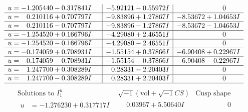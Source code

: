 \documentclass[1p]{elsarticle_modified}
\theoremstyle{definition}
\newcommand{\I}{\sqrt{-1}}
\begin{document}
$$\begin{array}{c|c|c}
\begin{aligned}
u &= -1.205440 - 0.317841 I\end{aligned}
 & -5.92121 - 0.55972 I & \phantom{-0.000000 } 0 \\ \hline\begin{aligned}
u &= \phantom{-}0.210116 + 0.707797 I\end{aligned}
 & -9.83896 + 1.27867 I & -8.53672 + 1.04653 I \\ \hline\begin{aligned}
u &= \phantom{-}0.210116 - 0.707797 I\end{aligned}
 & -9.83896 - 1.27867 I & -8.53672 - 1.04653 I \\ \hline\begin{aligned}
u &= -1.254520 + 0.166796 I\end{aligned}
 & -4.29080 + 2.46551 I & \phantom{-0.000000 } 0 \\ \hline\begin{aligned}
u &= -1.254520 - 0.166796 I\end{aligned}
 & -4.29080 - 2.46551 I & \phantom{-0.000000 } 0 \\ \hline\begin{aligned}
u &= -0.174059 + 0.708931 I\end{aligned}
 & -1.55154 + 0.37866 I & -6.90408 + 0.22967 I \\ \hline\begin{aligned}
u &= -0.174059 - 0.708931 I\end{aligned}
 & -1.55154 - 0.37866 I & -6.90408 - 0.22967 I \\ \hline\begin{aligned}
u &= \phantom{-}1.247700 + 0.308289 I\end{aligned}
 & \phantom{-}0.28331 - 2.20403 I & \phantom{-0.000000 } 0 \\ \hline\begin{aligned}
u &= \phantom{-}1.247700 - 0.308289 I\end{aligned}
 & \phantom{-}0.28331 + 2.20403 I & \phantom{-0.000000 } 0\\
 \hline 
 \end{array}$$\newpage$$\begin{array}{c|c|c}  
\text{Solutions to }I^u_{1}& \I (\text{vol} + \sqrt{-1}CS) & \text{Cusp shape}\\
 \hline 
\begin{aligned}
u &= -1.276230 + 0.317717 I\end{aligned}
 & \phantom{-}0.03967 + 5.50640 I & \phantom{-0.000000 } 0 \\ \hline\begin{aligned}

\end{aligned}
\end{array}$$
\end{document}
